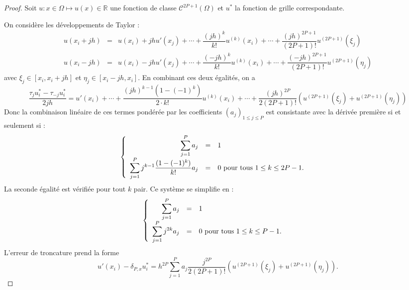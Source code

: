 \begin{proof}
Soit $u : x \in \Omega \mapsto u(x) \in \mathbb{R}$ une fonction de classe $\mathcal{C}^{2P+1}( \Omega)$ et $u^*$ la fonction de grille correspondante.

On considère les développements de Taylor :
\begin{equation}
\begin{array}{rcl}
u(x_i + jh) & = & u(x_i) + j h u'(x_j) + \cdots + \dfrac{(jh)^k}{k!}u^{(k)}(x_i) + \cdots +\dfrac{(jh)^{2P+1}}{(2P+1)!} u^{(2P+1)}(\xi_j)\\
u(x_i - jh) & = & u(x_i) - j h u'(x_j) + \cdots + \dfrac{(-jh)^k}{k!}u^{(k)}(x_i) + \cdots +\dfrac{(-jh)^{2P+1}}{(2P+1)!} u^{(2P+1)}(\eta_j)
\end{array}
\end{equation}
avec $\xi_j \in [x_i, x_i+jh]$ et $\eta_j \in [x_i-jh, x_i]$. En combinant ces deux égalités, on a
\begin{equation}
\dfrac{\tau_ju^*_i - \tau_{-j} u^*_i}{2jh} = u'(x_i) + \cdots + \dfrac{(jh)^{k-1}(1 - (-1)^k)}{2 \cdot k!} u^{(k)}(x_i) + \cdots +\dfrac{(jh)^{2P}}{2(2P+1)!} \left( u^{(2P+1)}(\xi_j) + u^{(2P+1)}(\eta_j) \right)
\end{equation}
Donc la combinaison linéaire de ces termes pondérée par les coefficients $(a_j)_{1 \leq j \leq P}$ est consistante avec la dérivée première si et seulement si :
\begin{equation}
\left\lbrace
\begin{array}{rcll}
\displaystyle\sum\limits_{j=1}^P a_j & = & 1 & \\
\displaystyle\sum\limits_{j=1}^P j^{k-1} \dfrac{(1 - (-1)^k)}{k!} a_j & = & 0 \text{ pour tous } 1 \leq k \leq 2P-1.
\end{array}
\right.
\end{equation}
La seconde égalité est vérifiée pour tout $k$ pair. Ce système se simplifie en :
\begin{equation}
\left\lbrace
\begin{array}{rcll}
\displaystyle\sum\limits_{j=1}^P a_j & = & 1 & \\
\displaystyle\sum\limits_{j=1}^P j^{2k} a_j & = & 0 \text{ pour tous } 1 \leq k \leq P-1.
\end{array}
\right.
\end{equation}
L'erreur de troncature prend la forme
\begin{equation}
u'(x_i) - \delta_{P,x} u^*_i = h^{2P} \sum_{j=1}^P a_j \dfrac{j^{2P}}{2(2P+1)!} \left( u^{(2P+1)}(\xi_j) + u^{(2P+1)}(\eta_j) \right).
\end{equation}
\end{proof}

